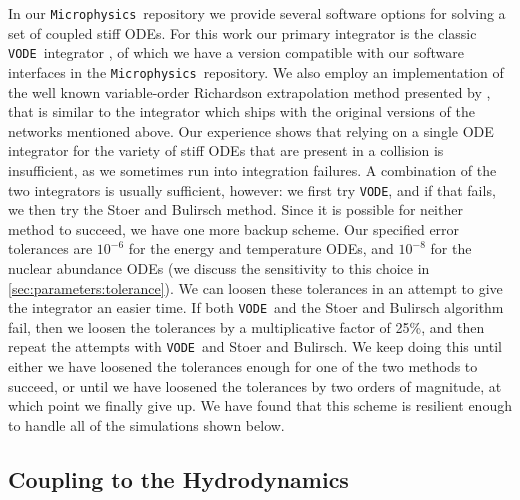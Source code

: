\documentclass[twocolumn,numberedappendix]{../aastex6}
\newcommand{\microphysics}{\texttt{Microphysics}}
\newcommand{\vode}{\texttt{VODE}}
\begin{document}
In our \microphysics\ repository we provide several software options for
solving a set of coupled stiff ODEs. For this work our primary integrator
is the classic \vode\ integrator \citep{vode}, of which we have a version
compatible with our software interfaces in the \microphysics\ repository.
We also employ an implementation of the well known variable-order Richardson
extrapolation method presented by \citet{stoer:1980}, that is similar to the
integrator which ships with the original versions of the networks mentioned
above. Our experience shows that relying on a single ODE integrator for the
variety of stiff ODEs that are present in a collision is insufficient, as we
sometimes run into integration failures. A combination of the two integrators
is usually sufficient, however: we first try \vode, and if that fails, we then
try the Stoer and Bulirsch method. Since it is possible for neither method to
succeed, we have one more backup scheme. Our specified error tolerances are
$10^{-6}$ for the energy and temperature ODEs, and $10^{-8}$ for the
nuclear abundance ODEs (we discuss the sensitivity to this choice in
\autoref{sec:parameters:tolerance}). We can loosen these tolerances in an
attempt to give the integrator an easier time. If both \vode\ and the Stoer
and Bulirsch algorithm fail, then we loosen the tolerances by a multiplicative
factor of 25\%, and then repeat the attempts with \vode\ and Stoer and Bulirsch.
We keep doing this until either we have loosened the tolerances enough for one
of the two methods to succeed, or until we have loosened the tolerances by two
orders of magnitude, at which point we finally give up. We have found that this
scheme is resilient enough to handle all of the simulations shown below.

\subsection{Coupling to the Hydrodynamics}
\label{sec:hydrocoupling}
\end{document}
